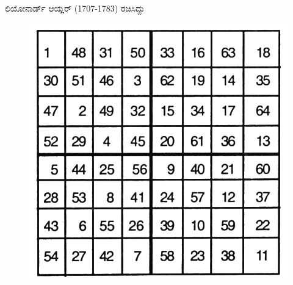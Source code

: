 \begin{itemize}
	ಲಿಯೋನಾರ್ಡ್ ಆಯ್ಲರ್ (1707-1783) ರಚಿಸಿದ್ದು
	\begin{figure}[H]
	\includegraphics[scale=.8]{src/figures/chap6/fig6.3.jpg}
	\end{figure}
\end{itemize}

